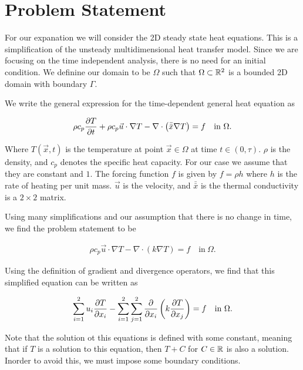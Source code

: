 \documentclass[../fem.tex]{subfiles}
\begin{document}
\section{Problem Statement}%
\label{sec:problem_statement}

For our expanation we will consider the 2D steady state heat equations. This is
a simplification of the unsteady multidimensional heat transfer model. Since we
are focusing on the time independent analysis, there is no need for an initial
condition. We definine our domain to be $\Omega$ such that $\Omega \subset
\R^2$ is a bounded 2D domain with boundary $\Gamma$.

We write the general expression for the time-dependent general heat equation as

\begin{align*}
  \rho c_p \pder[T]{t}+\rho c_p\vec{u}\cdot\nabla T - \nabla
  \cdot\left(\bar{\bar{x}}\nabla T\right)=f \quad \text{in}\ \Omega.
\end{align*}

Where $T(\vec{x},t)$ is the temperature at point $\vec{x}\in\Omega$ at time
$t\in(0,\tau)$. $\rho$ is the density, and $c_p$ denotes the specific heat
capacity. For our case we assume that they are constant and $1$. The forcing
function $f$ is given by $f=\rho h$ where $h$ is the rate of heating per unit
mass. $\vec{u}$ is the velocity, and $\bar{\bar{x}}$ is the thermal
conductivity is a $2\times 2$ matrix.

Using many simplifications and our assumption that there is no change in time,
we find the problem statement to be

\begin{align}\label{eq:pde}
  \rho c_p\vec{u}\cdot \nabla T-\nabla\cdot(k\nabla T)=f \quad \text{in}\ \Omega.
\end{align}

Using the definition of gradient and divergence operators, we find that this
simplified equation can be written as

\begin{align*}
  \sum_{i=1}^2u_i\pder[T]{x_i}-\sum_{i=1}^2\sum_{j=1}^2\pder{x_i}\left(k\pder[T]{x_j}\right)=f
    \quad \text{in}\ \Omega.
\end{align*}

Note that the solution ot this equations is defined with some constant, meaning
that if $T$ is a solution to this equation, then $T+C$ for $C\in\R$ is also a
solution. Inorder to avoid this, we must impose some boundary conditions.
\end{document}
